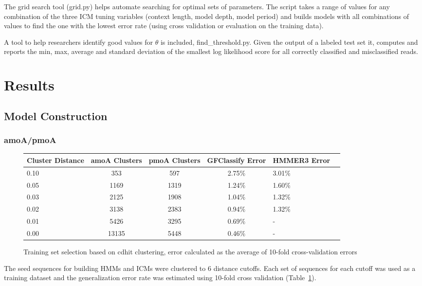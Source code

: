 \documentclass{article}
\begin{document}
The grid search tool (grid.py) helps automate searching for optimal sets of parameters.  The script takes a range of values for any combination of the three ICM tuning variables (context length, model depth, model period) and builds models with all combinations of values to find the one with the lowest error rate (using cross validation or evaluation on the training data).

A tool to help researchers identify good values for $\theta$ is included, find\_threshold.py.  Given the output of a labeled test set it, computes and reports the min, max, average and standard deviation of the smallest log likelihood score for all correctly classified and misclassified reads.

\section{Results}
\subsection{Model Construction}
\subsubsection{amoA/pmoA}
\begin{figure}
  \center
  \begin{tabularx}{\textwidth}{XcccXX}
    \hline
    Cluster Distance & amoA Clusters & pmoA Clusters & GFClassify Error & HMMER3 Error \\
    \hline
    0.10 & 353 & 597 & 2.75\% & 3.01\% \\
    0.05 & 1169 & 1319 & 1.24\% & 1.60\%\\
    0.03 & 2125 & 1908 & 1.04\% & 1.32\%\\
    0.02 & 3138 & 2383 & 0.94\% & 1.32\%\\
    0.01 & 5426 & 3295 & 0.69\% & -\\
    0.00 & 13135 & 5448 & 0.46\% & -\\
    \hline
  \end{tabularx}
  \caption{Training set selection based on cdhit clustering, error calculated as the average of 10-fold cross-validation errors}
  \label{tab:training_selection}
\end{figure}

The seed sequences for building HMMs and ICMs were clustered to 6 distance cutoffs.  Each set of sequences for each cutoff was used as a training dataset and the generalization error rate was estimated using 10-fold cross validation (Table~\ref{tab:training_selection}).
\end{document}
